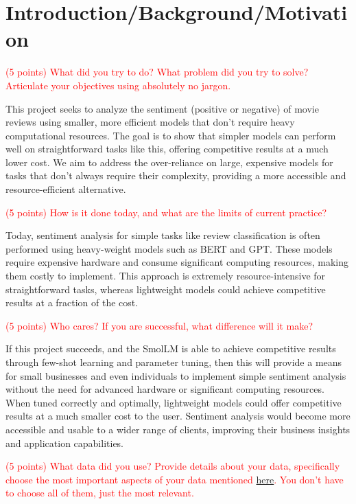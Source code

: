 \documentclass[10pt,twocolumn,letterpaper]{article}
\begin{document}
\section{Introduction/Background/Motivation}

\textcolor{red}{(5 points) What did you try to do? What problem did you try to solve? Articulate your objectives using absolutely no jargon. }

This project seeks to analyze the sentiment (positive or negative) of movie reviews using smaller, more efficient models that don't require heavy computational resources. The goal is to show that simpler models can perform well on straightforward tasks like this, offering competitive results at a much lower cost. We aim to address the over-reliance on large, expensive models for tasks that don't always require their complexity, providing a more accessible and resource-efficient alternative.

\textcolor{red}{(5 points) How is it done today, and what are the limits of current practice?}

Today, sentiment analysis for simple tasks like review classification is often performed using heavy-weight models such as BERT and GPT. These models require expensive hardware and consume significant computing resources, making them costly to implement. This approach is extremely resource-intensive for straightforward tasks, whereas lightweight models could achieve competitive results at a fraction of the cost.

\textcolor{red}{(5 points) Who cares? If you are successful, what difference will it make? }

If this project succeeds, and the SmolLM is able to achieve competitive results through few-shot learning and parameter tuning, then this will provide a means for small businesses and even individuals to implement simple sentiment analysis without the need for advanced hardware or significant computing resources. When tuned correctly and optimally, lightweight models could offer competitive results at a much smaller cost to the user. Sentiment analysis would become more accessible and usable to a wider range of clients, improving their business insights and application capabilities. 

\textcolor{red}{(5 points) What data did you use? Provide details about your data, specifically choose the most important aspects of your data mentioned \href{https://arxiv.org/abs/1803.09010}{here}. You don’t have to choose all of them, just the most relevant.}
\end{document}
